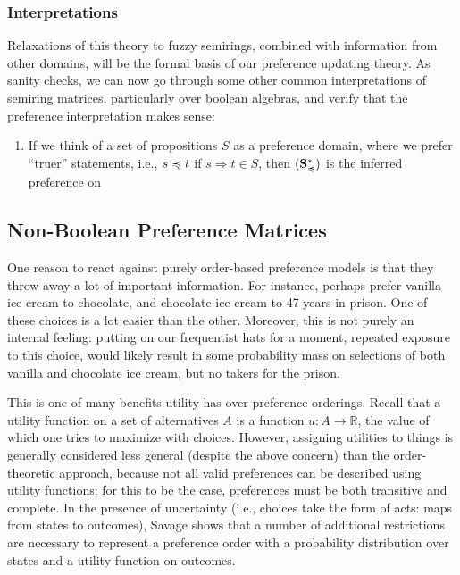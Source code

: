\documentclass{article}
\begin{document}
	\subsubsection{Interpretations}
	Relaxations of this theory to fuzzy semirings, combined with information from other domains, will be the formal basis of our preference updating theory. As sanity checks, we can now go through some other common interpretations of semiring matrices, particularly over boolean algebras, and verify that the preference interpretation makes sense:
	
	\begin{enumerate}[nosep]
		\item If we think of a set of propositions $S$ as a preference domain, where we prefer ``truer'' statements, i.e., $s \preccurlyeq t$ if $s \Rightarrow t \in S$, then $(\mathbf S_\preccurlyeq^*)$ is the inferred preference on 
	\end{enumerate}

	\subsection{Non-Boolean Preference Matrices} \label{sec:nbpref}
	One reason to react against purely order-based preference models is that they throw away a lot of important information. For instance, perhaps prefer vanilla ice cream to chocolate, and chocolate ice cream to 47 years in prison. One of these choices is a lot easier than the other. Moreover, this is not purely an internal feeling: putting on our frequentist hats for a moment, repeated exposure to this choice, would likely result in some probability mass on selections of both vanilla and chocolate ice cream, but no takers for the prison.
	
	This is one of many benefits utility has over preference orderings. Recall that a utility function on a set of alternatives $A$ is a function $u : A \to \mathbb R$, the value of which one tries to maximize with choices. 
	However, assigning utilities to things is generally considered less general (despite the above concern) than the order-theoretic approach, because not all valid preferences can be described using utility functions: for this to be the case, preferences must be both transitive and complete. In the presence of uncertainty (i.e., choices take the form of acts: maps from states to outcomes), Savage \cite{savage1972foundations} shows that a number of additional restrictions are necessary to represent a preference order with a probability distribution over states and a utility function on outcomes. 
	
\end{document}
